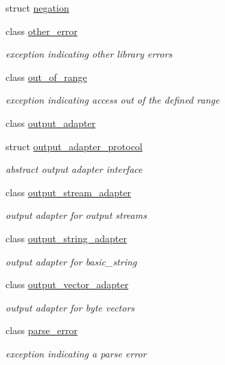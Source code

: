 \begin{DoxyCompactItemize}
\item 
struct \hyperlink{structnlohmann_1_1detail_1_1negation}{negation}
\item 
class \hyperlink{classnlohmann_1_1detail_1_1other__error}{other\+\_\+error}
\begin{DoxyCompactList}\small\item\em exception indicating other library errors \end{DoxyCompactList}\item 
class \hyperlink{classnlohmann_1_1detail_1_1out__of__range}{out\+\_\+of\+\_\+range}
\begin{DoxyCompactList}\small\item\em exception indicating access out of the defined range \end{DoxyCompactList}\item 
class \hyperlink{classnlohmann_1_1detail_1_1output__adapter}{output\+\_\+adapter}
\item 
struct \hyperlink{structnlohmann_1_1detail_1_1output__adapter__protocol}{output\+\_\+adapter\+\_\+protocol}
\begin{DoxyCompactList}\small\item\em abstract output adapter interface \end{DoxyCompactList}\item 
class \hyperlink{classnlohmann_1_1detail_1_1output__stream__adapter}{output\+\_\+stream\+\_\+adapter}
\begin{DoxyCompactList}\small\item\em output adapter for output streams \end{DoxyCompactList}\item 
class \hyperlink{classnlohmann_1_1detail_1_1output__string__adapter}{output\+\_\+string\+\_\+adapter}
\begin{DoxyCompactList}\small\item\em output adapter for basic\+\_\+string \end{DoxyCompactList}\item 
class \hyperlink{classnlohmann_1_1detail_1_1output__vector__adapter}{output\+\_\+vector\+\_\+adapter}
\begin{DoxyCompactList}\small\item\em output adapter for byte vectors \end{DoxyCompactList}\item 
class \hyperlink{classnlohmann_1_1detail_1_1parse__error}{parse\+\_\+error}
\begin{DoxyCompactList}\small\item\em exception indicating a parse error \end{DoxyCompactList}\item 

\end{DoxyCompactItemize}

